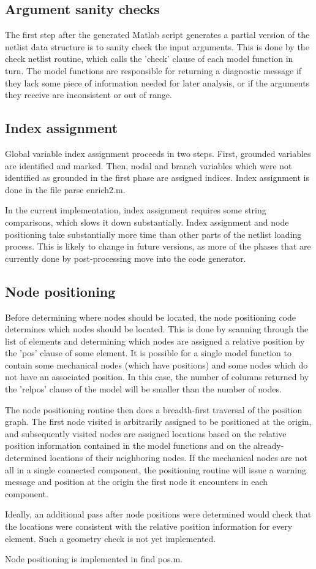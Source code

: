 \subsection{Argument sanity checks}

The first step after the generated Matlab script generates a partial version of
the netlist data structure is to sanity check the input arguments. This is done
by the check netlist routine, which calls the 'check' clause of each model
function in turn. The model functions are responsible for returning a diagnostic
message if they lack some piece of information needed for later analysis, or if
the arguments they receive are inconsistent or out of range.

\subsection{Index assignment}

Global variable index assignment proceeds in two steps. First, grounded
variables are identified and marked. Then, nodal and branch variables which
were not identified as grounded in the first phase are assigned indices. Index
assignment is done in the file parse enrich2.m.

In the current implementation, index assignment requires some string
comparisons, which slows it down substantially. Index assignment and node
positioning take substantially more time than other parts of the netlist
loading process. This is likely to change in future versions, as more of the
phases that are currently done by post-processing move into the code generator.

\subsection{Node positioning}

Before determining where nodes should be located, the node positioning code
determines which nodes should be located. This is done by scanning through the
list of elements and determining which nodes are assigned a relative position
by the 'pos' clause of some element. It is possible for a single model function
to contain some mechanical nodes (which have positions) and some nodes which do
not have an associated position. In this case, the number of columns returned
by the 'relpos' clause of the model will be smaller than the number of nodes.

The node positioning routine then does a breadth-first traversal of the
position graph. The first node visited is arbitrarily assigned to be positioned
at the origin, and subsequently visited nodes are assigned locations based on
the relative position information contained in the model functions and on the
already-determined locations of their neighboring nodes. If the mechanical
nodes are not all in a single connected component, the positioning routine will
issue a warning message and position at the origin the first node it encounters
in each component.

Ideally, an additional pass after node positions were determined would check
that the locations were consistent with the relative position information for
every element. Such a geometry check is not yet implemented.

Node positioning is implemented in find pos.m.



